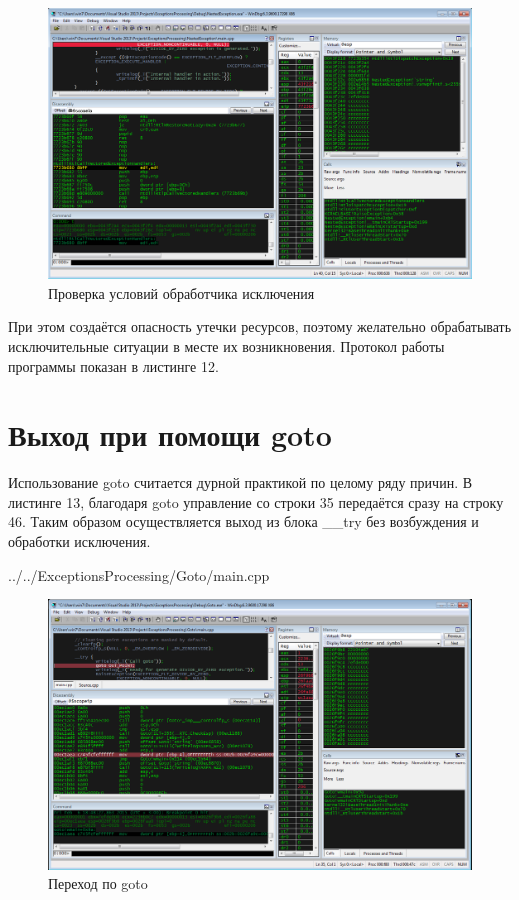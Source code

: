 \documentclass[a4paper, 12pt]{report}		%
\begin{document}
\begin{figure}[h!]
\centering
\includegraphics[scale=0.50]{res/009}
\caption{Проверка условий обработчика исключения}
\end{figure}

При этом создаётся опасность утечки ресурсов, поэтому желательно обрабатывать исключительные ситуации в месте их возникновения. Протокол работы программы показан в листинге 12.



\chapter*{Выход при помощи goto}

Использование goto считается дурной практикой по целому ряду причин. В листинге 13, благодаря goto управление со строки 35 передаётся сразу на строку 46. Таким образом осуществляется выход из блока \_\_try без возбуждения и обработки исключения.


{../../ExceptionsProcessing/Goto/main.cpp}

\begin{figure}[h!]
\centering
\includegraphics[scale=0.50]{res/010}
\caption{Переход по goto}
\end{figure}
\end{document}
